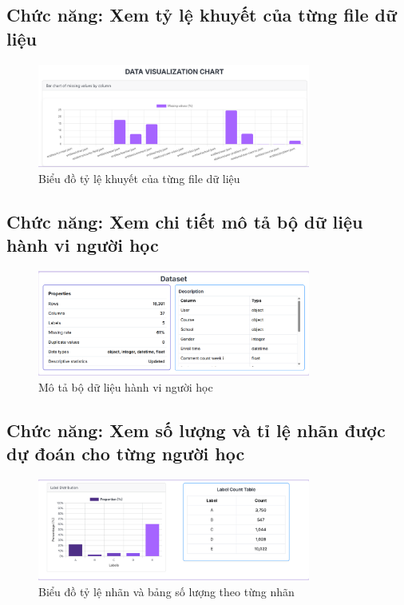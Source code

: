 \subsection{Chức năng: Xem tỷ lệ khuyết của từng file dữ liệu}
\begin{figure}[H]
    \centering
    \includegraphics[width = 0.8\textwidth]{imgs/demo-9.png}
    \caption{Biểu đồ tỷ lệ khuyết của từng file dữ liệu}
    \label{fig:demo-9}
\end{figure}
\subsection{Chức năng: Xem chi tiết mô tả bộ dữ liệu hành vi người học}
\begin{figure}[H]
    \centering
    \includegraphics[width = 0.8\textwidth]{imgs/demo-10.png}
    \caption{Mô tả bộ dữ liệu hành vi người học}
    \label{fig:demo-10}
\end{figure}
\subsection{Chức năng: Xem số lượng và tỉ lệ nhãn được dự đoán cho từng người học}
\begin{figure}[H]
    \centering
    \includegraphics[width = 0.8\textwidth]{imgs/demo-11.png}
    \caption{Biểu đồ tỷ lệ nhãn và bảng số lượng theo từng nhãn}
    \label{fig:demo-11}
\end{figure}
